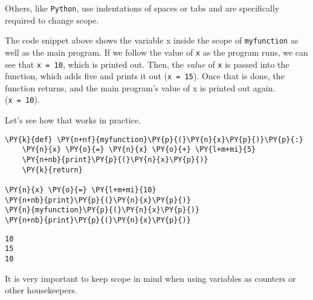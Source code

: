 Others, like \texttt{Python}, use indentations of spaces or tabs and are
specifically required to change scope.

\begin{Shaded}
\begin{Highlighting}[]
\OperatorTok{=}\OperatorTok{+} 

\OperatorTok{=} 
\end{Highlighting}
\end{Shaded}

The code snippet above shows the variable x inside the scope of
\texttt{myfunction} as well as the main program. If we follow the value
of \texttt{x} as the program runs, we can see that \texttt{x\ =\ 10},
which is printed out. Then, the \emph{value} of \texttt{x} is passed
into the function, which adds five and prints it out
(\texttt{x\ =\ 15}). Once that is done, the function returns, and the
main program's value of x is printed out again. (\texttt{x\ =\ 10}).

Let's see how that works in practice.

    \begin{tcolorbox}[breakable, size=fbox, boxrule=1pt, pad at break*=1mm,colback=cellbackground, colframe=cellborder]
\begin{Verbatim}[commandchars=\\\{\}]
\PY{k}{def} \PY{n+nf}{myfunction}\PY{p}{(}\PY{n}{x}\PY{p}{)}\PY{p}{:}
    \PY{n}{x} \PY{o}{=} \PY{n}{x} \PY{o}{+} \PY{l+m+mi}{5}
    \PY{n+nb}{print}\PY{p}{(}\PY{n}{x}\PY{p}{)}
    \PY{k}{return}

\PY{n}{x} \PY{o}{=} \PY{l+m+mi}{10}
\PY{n+nb}{print}\PY{p}{(}\PY{n}{x}\PY{p}{)}
\PY{n}{myfunction}\PY{p}{(}\PY{n}{x}\PY{p}{)}
\PY{n+nb}{print}\PY{p}{(}\PY{n}{x}\PY{p}{)}
\end{Verbatim}
\end{tcolorbox}

    \begin{Verbatim}[commandchars=\\\{\}]
10
15
10
    \end{Verbatim}

    It is very important to keep scope in mind when using variables as
counters or other housekeepers.

